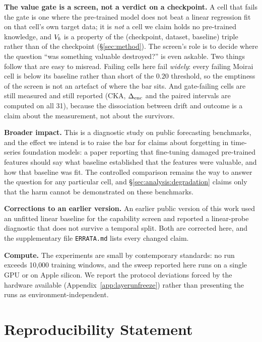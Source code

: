 \textbf{The value gate is a screen, not a verdict on a checkpoint.}  A cell that
fails the gate is one where the pre-trained model does not beat a linear regression
fit on that cell's own target data; it is \emph{not} a cell we claim holds no
pre-trained knowledge, and $V_{b}$ is a property of the (checkpoint, dataset,
baseline) triple rather than of the checkpoint (\S\ref{sec:method}).  The screen's
role is to decide where the question ``was something valuable destroyed?'' is even
askable.  Two things follow that are easy to misread.  Failing cells here fail
\emph{widely}: every failing Moirai cell is below its baseline rather than short of
the $0.20$ threshold, so the emptiness of the screen is not an artefact of where the
bar sits.  And gate-failing cells are still measured and still reported (CKA,
$\Delta_\text{enc}$ and the paired intervals are computed on all 31), because the dissociation
between drift and outcome is a claim about the measurement, not about the survivors.

\textbf{Broader impact.}  This is a diagnostic study on public forecasting
benchmarks, and the effect we intend is to raise the bar for claims about
forgetting in time-series foundation models: a paper reporting that fine-tuning
damaged pre-trained features should say what baseline established that the
features were valuable, and how that baseline was fit.  The controlled
comparison remains the way to answer the question for any particular cell, and
\S\ref{sec:analysis:degradation} claims only that the harm cannot be demonstrated
on these benchmarks.

\textbf{Corrections to an earlier version.}  An earlier public version of this
work used an unfitted linear baseline for the capability screen and reported a
linear-probe diagnostic that does not survive a temporal split.  Both are
corrected here, and the supplementary file \texttt{ERRATA.md} lists every
changed claim.

\textbf{Compute.}  The experiments are small by contemporary standards: no run
exceeds 10{,}000 training windows, and the sweep reported here runs on a single
GPU or on Apple silicon.  We report the protocol deviations forced by the
hardware available (Appendix~\ref{app:layerunfreeze}) rather than presenting the
runs as environment-independent.

\section*{Reproducibility Statement}

